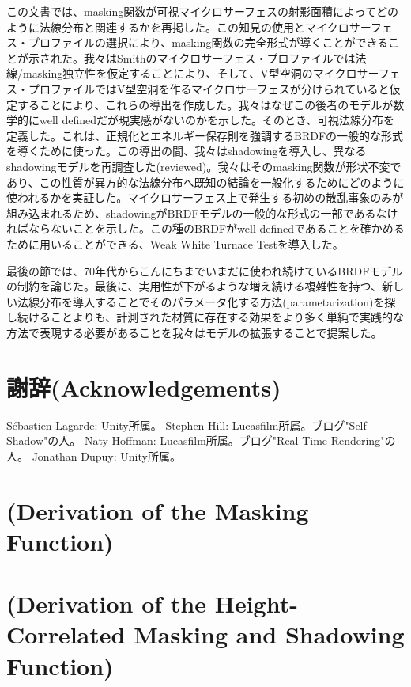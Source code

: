 \documentclass[a4j,xelatex,ja=standard]{bxjsarticle}
\begin{document}
この文書では、masking関数が可視マイクロサーフェスの射影面積によってどのように法線分布と関連するかを再掲した。この知見の使用とマイクロサーフェス・プロファイルの選択により、masking関数の完全形式が導くことができることが示された。我々はSmithのマイクロサーフェス・プロファイルでは法線/masking独立性を仮定することにより、そして、V型空洞のマイクロサーフェス・プロファイルではV型空洞を作るマイクロサーフェスが分けられていると仮定することにより、これらの導出を作成した。我々はなぜこの後者のモデルが数学的にwell definedだが現実感がないのかを示した。そのとき、可視法線分布を定義した。これは、正規化とエネルギー保存則を強調するBRDFの一般的な形式を導くために使った。この導出の間、我々はshadowingを導入し、異なるshadowingモデルを再調査した(reviewed)。我々はそのmasking関数が形状不変であり、この性質が異方的な法線分布へ既知の結論を一般化するためにどのように使われるかを実証した。マイクロサーフェス上で発生する初めの散乱事象のみが組み込まれるため、shadowingがBRDFモデルの一般的な形式の一部であるなければならないことを示した。この種のBRDFがwell definedであることを確かめるために用いることができる、Weak White Turnace Testを導入した。

最後の節では、70年代からこんにちまでいまだに使われ続けているBRDFモデル\cite{Cook1982}の制約を論じた。最後に、実用性が下がるような増え続ける複雑性を持つ、新しい法線分布を導入することでそのパラメータ化する方法(parametarization)を探し続けることよりも、計測された材質に存在する効果をより多く単純で実践的な方法で表現する必要があることを我々はモデルの拡張することで提案した。

\section*{謝辞(Acknowledgements)}

Sébastien Lagarde: Unity所属。
Stephen Hill: Lucasfilm所属。ブログ"Self Shadow"の人。
Naty Hoffman: Lucasfilm所属。ブログ"Real-Time Rendering"の人。
Jonathan Dupuy: Unity所属。

\printbibliography[title=参考文献]

\appendix

\section{(Derivation of the Masking Function)}
\label{sec:A}

\section{(Derivation of the Height-Correlated Masking and Shadowing Function)}
\label{sec:B}
\end{document}

